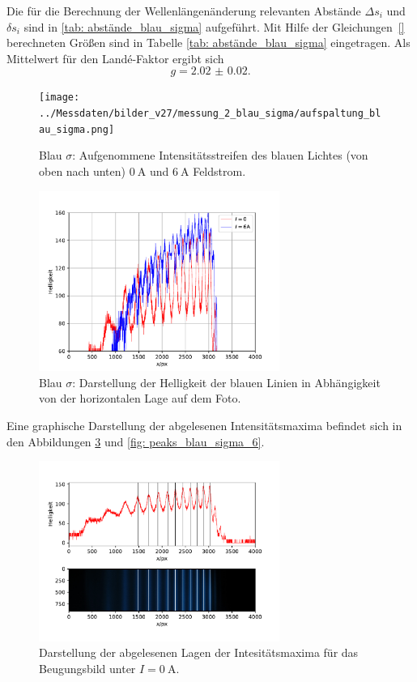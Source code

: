 Die für die Berechnung der Wellenlängenänderung relevanten Abstände $\Delta s_i$ und $\delta s_i$
sind in \autoref{tab: abstände_blau_sigma}
aufgeführt. Mit Hilfe der Gleichungen~\eqref{} berechneten Größen sind in Tabelle
\ref{tab: abstände_blau_sigma} eingetragen. Als Mittelwert für den Landé-Faktor ergibt sich
\begin{equation}
  g = \num{2.02(2)}.
\end{equation}
\begin{figure}
  \centering
  \texttt{[image: ../Messdaten/bilder\_v27/messung\_2\_blau\_sigma/aufspaltung\_blau\_sigma.png]}
  \caption{Blau $\sigma$: Aufgenommene Intensitätsstreifen des blauen Lichtes (von oben nach unten) $\SI{0}{\ampere}$ und $\SI{6}{\ampere}$ Feldstrom.}
  \label{fig: aufspaltung_blau_sigma}
\end{figure}
\begin{figure}
  \centering
  \includegraphics[width = 0.7\textwidth]{../Messdaten/plots/blau_sigma_intensitaet.pdf}
  \caption{Blau $\sigma$: Darstellung der Helligkeit der blauen Linien in Abhängigkeit von der horizontalen Lage auf dem Foto.}
  \label{fig: blau_intensität_sigma}
\end{figure}

Eine graphische Darstellung der abgelesenen Intensitätsmaxima befindet sich in den Abbildungen \ref{fig: peaks_blau_0} und \ref{fig: peaks_blau_sigma_6}. %
\begin{figure}
  \centering
  \includegraphics[width = 0.7\textwidth]{../Messdaten/plots/peaks_blau_sigma_0.pdf}
  \caption{Darstellung der abgelesenen Lagen der Intesitätsmaxima für das Beugungsbild unter $I =\SI{0}{\ampere}$.}
  \label{fig: peaks_blau_0}
\end{figure}
